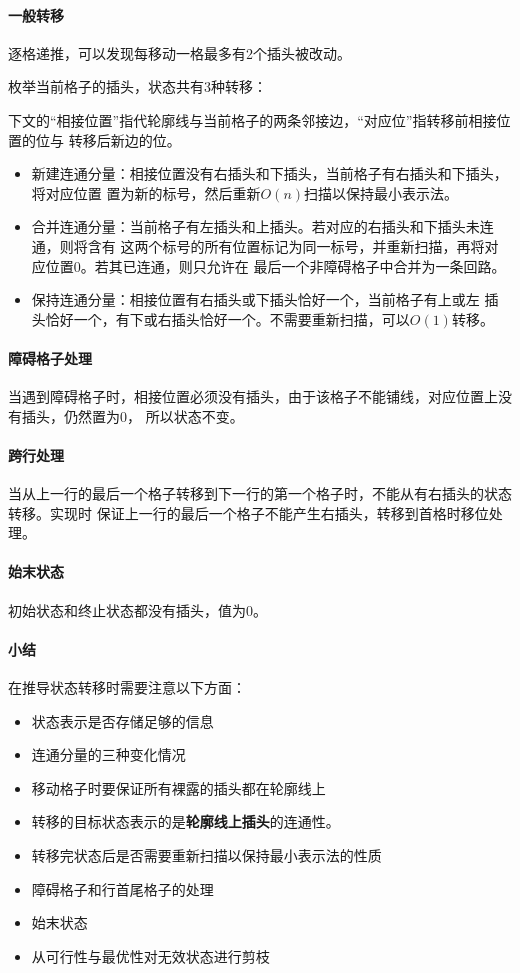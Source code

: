 \paragraph{一般转移}
逐格递推，可以发现每移动一格最多有2个插头被改动。

枚举当前格子的插头，状态共有3种转移：

下文的``相接位置''指代轮廓线与当前格子的两条邻接边，``对应位''指转移前相接位置的位与
转移后新边的位。
\begin{itemize}
    \item 新建连通分量：相接位置没有右插头和下插头，当前格子有右插头和下插头，将对应位置
    置为新的标号，然后重新$O(n)$扫描以保持最小表示法。
    \item 合并连通分量：当前格子有左插头和上插头。若对应的右插头和下插头未连通，则将含有
    这两个标号的所有位置标记为同一标号，并重新扫描，再将对应位置0。若其已连通，则只允许在
    最后一个非障碍格子中合并为一条回路。
    \item 保持连通分量：相接位置有右插头或下插头恰好一个，当前格子有上或左
    插头恰好一个，有下或右插头恰好一个。不需要重新扫描，可以$O(1)$转移。
\end{itemize}
\paragraph{障碍格子处理}
当遇到障碍格子时，相接位置必须没有插头，由于该格子不能铺线，对应位置上没有插头，仍然置为0，
所以状态不变。
\paragraph{跨行处理}
当从上一行的最后一个格子转移到下一行的第一个格子时，不能从有右插头的状态转移。实现时
保证上一行的最后一个格子不能产生右插头，转移到首格时移位处理。
\paragraph{始末状态}
初始状态和终止状态都没有插头，值为0。
\paragraph{小结}
在推导状态转移时需要注意以下方面：
\begin{itemize}
    \item 状态表示是否存储足够的信息
    \item 连通分量的三种变化情况
    \item 移动格子时要保证所有裸露的插头都在轮廓线上
    \item 转移的目标状态表示的是{\bfseries 轮廓线上插头}的连通性。
    \item 转移完状态后是否需要重新扫描以保持最小表示法的性质
    \item 障碍格子和行首尾格子的处理
    \item 始末状态
    \item 从可行性与最优性对无效状态进行剪枝
\end{itemize}
